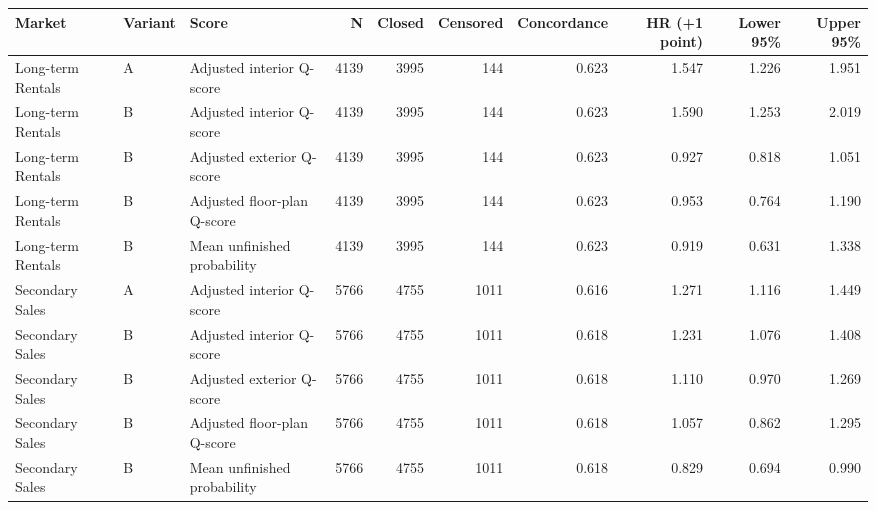 \begin{tabular}{lllrrrrrrr}
\toprule
Market & Variant & Score & N & Closed & Censored & Concordance & HR (+1 point) & Lower 95\% & Upper 95\% \\
\midrule
Long-term Rentals & A & Adjusted interior Q-score & 4139 & 3995 & 144 & 0.623 & 1.547 & 1.226 & 1.951 \\
Long-term Rentals & B & Adjusted interior Q-score & 4139 & 3995 & 144 & 0.623 & 1.590 & 1.253 & 2.019 \\
Long-term Rentals & B & Adjusted exterior Q-score & 4139 & 3995 & 144 & 0.623 & 0.927 & 0.818 & 1.051 \\
Long-term Rentals & B & Adjusted floor-plan Q-score & 4139 & 3995 & 144 & 0.623 & 0.953 & 0.764 & 1.190 \\
Long-term Rentals & B & Mean unfinished probability & 4139 & 3995 & 144 & 0.623 & 0.919 & 0.631 & 1.338 \\
Secondary Sales & A & Adjusted interior Q-score & 5766 & 4755 & 1011 & 0.616 & 1.271 & 1.116 & 1.449 \\
Secondary Sales & B & Adjusted interior Q-score & 5766 & 4755 & 1011 & 0.618 & 1.231 & 1.076 & 1.408 \\
Secondary Sales & B & Adjusted exterior Q-score & 5766 & 4755 & 1011 & 0.618 & 1.110 & 0.970 & 1.269 \\
Secondary Sales & B & Adjusted floor-plan Q-score & 5766 & 4755 & 1011 & 0.618 & 1.057 & 0.862 & 1.295 \\
Secondary Sales & B & Mean unfinished probability & 5766 & 4755 & 1011 & 0.618 & 0.829 & 0.694 & 0.990 \\
\bottomrule
\end{tabular}

